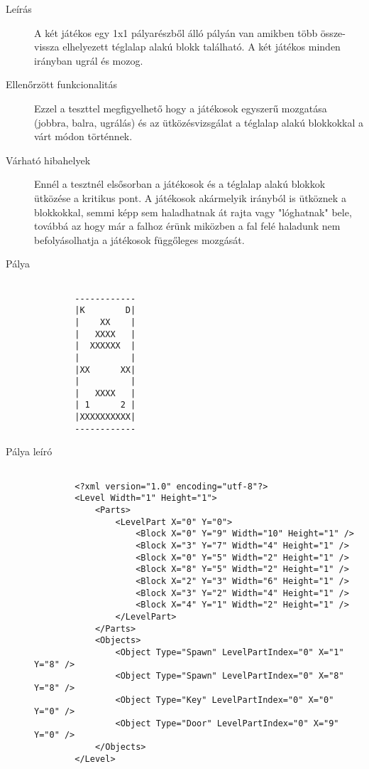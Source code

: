 \begin{description}
	
	\item[Leírás] A két játékos egy 1x1 pályarészből álló pályán van amikben több össze-vissza elhelyezett téglalap alakú blokk található. A két játékos minden irányban ugrál és mozog.
	
	\item[Ellenőrzött funkcionalitás] Ezzel a teszttel megfigyelhető hogy a játékosok egyszerű mozgatása (jobbra, balra, ugrálás) és az ütközésvizsgálat a téglalap alakú blokkokkal a várt módon történnek.
	
	\item[Várható hibahelyek] Ennél a tesztnél elsősorban a játékosok és a téglalap alakú blokkok ütközése a kritikus pont. A játékosok akármelyik irányból is ütköznek a blokkokkal, semmi képp sem haladhatnak át rajta vagy "lóghatnak" bele, továbbá az hogy már a falhoz érünk miközben a fal felé haladunk nem befolyásolhatja a játékosok függőleges mozgását.

	\item[Pálya]
	\begin{verbatim}
	
		------------
		|K        D|
		|    XX    |
		|   XXXX   |
		|  XXXXXX  |
		|          |
		|XX      XX|
		|          |
		|   XXXX   |
		| 1      2 |
		|XXXXXXXXXX|
		------------	
	\end{verbatim}

	\item[Pálya leíró]
	\begin{verbatim}
	
		<?xml version="1.0" encoding="utf-8"?>
		<Level Width="1" Height="1">
		    <Parts>
		        <LevelPart X="0" Y="0">
		            <Block X="0" Y="9" Width="10" Height="1" />
		            <Block X="3" Y="7" Width="4" Height="1" />
		            <Block X="0" Y="5" Width="2" Height="1" />
		            <Block X="8" Y="5" Width="2" Height="1" />
		            <Block X="2" Y="3" Width="6" Height="1" />
		            <Block X="3" Y="2" Width="4" Height="1" />
		            <Block X="4" Y="1" Width="2" Height="1" />
		        </LevelPart>
		    </Parts>
		    <Objects>
		        <Object Type="Spawn" LevelPartIndex="0" X="1" Y="8" />
		        <Object Type="Spawn" LevelPartIndex="0" X="8" Y="8" />
		        <Object Type="Key" LevelPartIndex="0" X="0" Y="0" />
		        <Object Type="Door" LevelPartIndex="0" X="9" Y="0" />
		    </Objects>
		</Level>
	\end{verbatim}
	

\end{description}
